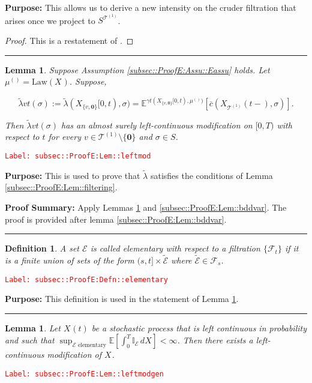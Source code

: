 \documentclass[12pt]{article}
\newcommand{\mb}{\mathbb}
\newcommand{\mc}{\mathcal}
\newcommand{\ov}{\overline}
\newcommand{\te}{\text}
\newcommand{\tr}{\textcolor{red}}
\newcommand{\labe}[1]{\tr{\texttt{Label: #1}}}
\newcommand{\purpose}{\textbf{Purpose: }}
\newcommand{\pfsum}{\textbf{Proof Summary: }}
\newcommand{\lin}{\rule{\linewidth}{0.4 pt}}
\newcommand{\ex}[1]{\mb{E}\left[#1\right]}			%
\newcommand{\exmu}[2]{\mb{E}^{#1}\left[#2\right]}	%
\renewcommand{\root}{\mathbf{0}}				%
\renewcommand{\v}{v}							%
\renewcommand{\S}{S}							%
\newcommand{\s}{\sigma}							%
\newcommand{\T}{T}								%
\renewcommand{\t}{t}							%
\renewcommand{\tt}{s}							%
\newcommand{\F}{\mc{F}}							%
\newcommand{\X}{X}								%
\newcommand{\carp}[1]{^{#1}}					%
\newcommand{\vsi}[1]{^{#1}}						%
\newcommand{\cind}[1]{_{#1}}					%
\newcommand{\tp}[1]{(#1)}						%
\newcommand{\tip}[1]{#1}						%
\newcommand{\ts}[1]{_{#1}}						%
\newcommand{\IGrg}{\ov{c}}						%
\newcommand{\tree}{\mc{T}}						%
\newcommand{\sln}[1]{^{(#1)}}						%
\newcommand{\alt}[1]{\widetilde{#1}}			%
\newcommand{\m}{\mu}							%
\newcommand{\cm}{\gamma}						%
\newcommand{\law}{\te{Law}}						%
\newcommand{\evnt}{\mc{E}}						%
\newcommand{\crate}{\alt{\lambda}}				%
\newtheorem{lem}[thms]{Lemma}
\newtheorem{defn}[thms]{Definition}
\begin{document}
\purpose This allows us to derive a new intensity on the cruder filtration that arises once we project to \(\S\carp{\tree\sln{1}}\).

\begin{proof}
This is a restatement of \cite[Theorem 14.3.III]{DalVer08}.
\end{proof}

\lin

\begin{lem}
Suppose Assumption \ref{subsec::ProofE:Assu::Eassu} holds. Let \(\m\sln{}\ts{} = \law(\X\cind{}\tip{})\). Suppose,

\[\crate{\v}{\t}(\s) := \crate{}{}(\X\cind{\{\v,\root\}}\tip{[0,\t)},\s) = \exmu{\cm{\t}(\X\cind{\{\v,\root\}}\tip{[0,\t)},\m\sln{}\ts{})}{\IGrg(\X\cind{\tree\sln{1}}\tp{\t-},\s)}.\]


Then \(\crate{\v}{\t}(\s)\) has an almost surely left-continuous modification on \([0,\T)\) with respect to \(\t\) for every \(\v \in \tree\sln{1}\setminus\{\root\}\) and \(\s \in \S\).
\label{subsec::ProofE:Lem::leftmod}
\end{lem}
\labe{subsec::ProofE:Lem::leftmod}

\purpose This is used to prove that \(\crate{}{}\) satisfies the conditions of Lemma \ref{subsec::ProofE:Lem::filtering}.

\pfsum Apply Lemmas \ref{subsec::ProofE:Lem::leftmodgen} and \ref{subsec::ProofE:Lem::bddvar}. The proof is provided after lemma \ref{subsec::ProofE:Lem::bddvar}.

\lin

\begin{defn}
A set \(\evnt{}\) is called elementary with respect to a filtration \(\{\F\vsi{}\ts{\t}\}\) if it is a finite union of sets of the form \((\tt,\t]\times \alt{\evnt}\) where \(\alt{\evnt} \in \F\vsi{}\ts{\tt}\).
\label{subsec::ProofE:Defn::elementary}
\end{defn}
\labe{subsec::ProofE:Defn::elementary}

\purpose This definition is used in the statement of Lemma \ref{subsec::ProofE:Lem::leftmodgen}.

\lin

\begin{lem}
Let \(\X\cind{}\tp{\t}\) be a stochastic process that is left continuous in probability and such that \(\sup_{\evnt{}\te{ elementary}}\ex{\int_0^\T \mb{I}_\evnt{}\,d\X\cind{}\tip{}} < \infty\). Then there exists a left-continuous modification of \(\X\cind{}\tip{}\).
\label{subsec::ProofE:Lem::leftmodgen}
\end{lem}
\labe{subsec::ProofE:Lem::leftmodgen}
\end{document}
